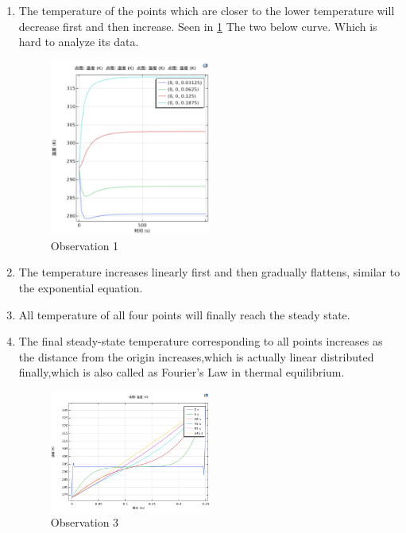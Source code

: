 \documentclass[12pt]{article}
\numberwithin{equation}{section}
\begin{document}
\begin{enumerate}
  \item The temperature of the points which are closer to the lower temperature will decrease first and then increase. Seen in \ref{Oberservation1} The two below curve. Which is hard to analyze its data.



\begin{figure}[H] %
\centering %
\includegraphics[width=0.5\textwidth]{Observation1.png} %
\caption{Observation 1} %
\label{Oberservation1}
\end{figure} 

\item The temperature increases linearly first and then gradually flattens, similar to the exponential equation.
  \item All temperature of all four points will finally reach the steady state.
  \item The final steady-state temperature corresponding to all points increases as the distance from the origin increases,which is actually linear distributed finally,which is also called as Fourier's Law in thermal equilibrium.
 
 
 \begin{figure}[H] %
\centering %
\includegraphics[width=0.5\textwidth]{Observation3.png} %
\caption{Observation 3} %
\end{figure} 


\end{enumerate}
\end{document}
